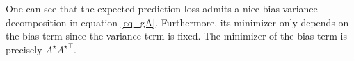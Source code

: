 	One can see that the expected prediction loss admits a nice bias-variance decomposition in equation \eqref{eq_gA}.
	Furthermore, its minimizer only depends on the bias term since the variance term is fixed.
	The minimizer of the bias term is precisely $A^{\star} {A^{\star}}^{\top}$.


